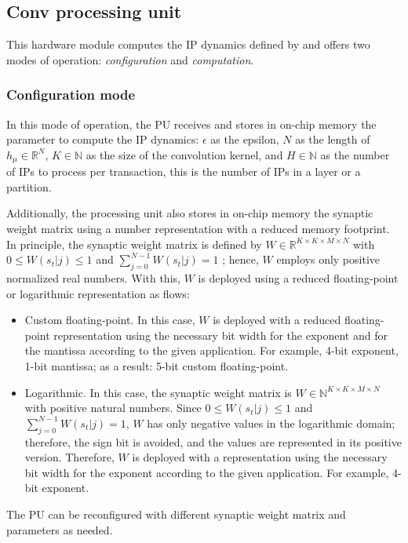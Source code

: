 \subsection{Conv processing unit}
This hardware module computes the IP dynamics defined by  and offers two modes of operation: \emph{configuration} and \emph{computation}.

\subsubsection{Configuration mode}
In this mode of operation, the PU receives and stores in on-chip memory the parameter to compute the IP dynamics: $\epsilon$ as the epsilon, $N$ as the length of $h_\mu\in\mathbb{R}^{N}$, $K\in\mathbb{N}$ as the size of the convolution kernel, and $H\in\mathbb{N}$ as the number of IPs to process per transaction, this is the number of IPs in a layer or a partition.

Additionally, the processing unit also stores in on-chip memory the synaptic weight matrix using a number representation with a reduced memory footprint. In principle, the synaptic weight matrix is defined by $W\in\mathbb{R}^{K\times K\times M\times N}$ with $0\le W(s_t|j)\le1$ and $\sum_{j=0}^{N-1}W(s_t|j)=1$ \cite{rotermund2019Backpropagation}; hence, $W$ employs only positive normalized real numbers. With this, $W$ is deployed using a reduced floating-point or logarithmic representation as flows:

\begin{itemize}
	\item{Custom floating-point}.
	In this case, $W$ is deployed with a reduced floating-point representation using the necessary bit width for the exponent and for the mantissa according to the given application. For example, 4-bit exponent, 1-bit mantissa; as a result: 5-bit custom floating-point.
	\item{Logarithmic}.
	In this case, the synaptic weight matrix is $W\in\mathbb{N}^{K\times K\times M\times N}$ with positive natural numbers. Since $0\le W(s_t|j)\le1$ and $\sum_{j=0}^{N-1}W(s_t|j)=1$, $W$ has only negative values in the logarithmic domain; therefore, the sign bit is avoided, and the values are represented in its positive version. Therefore, $W$ is deployed with a representation using the necessary bit width for the exponent according to the given application. For example, 4-bit exponent.
\end{itemize}

The PU can be reconfigured with different synaptic weight matrix and parameters as needed.


